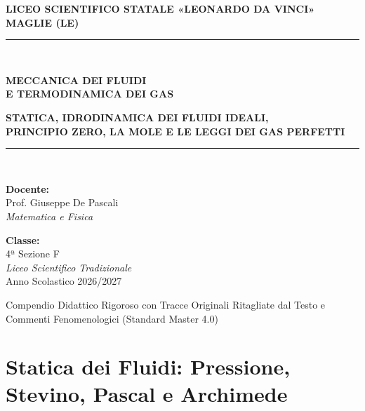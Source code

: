 \documentclass[11pt,a4paper,oneside]{report}
\begin{document}
\begin{titlepage}
\begin{center}
  \vspace*{1.0cm}
  {\Large\textbf{LICEO SCIENTIFICO STATALE «LEONARDO DA VINCI»}}\\[0.3cm]
  {\large\textbf{MAGLIE (LE)}}\\[1.8cm]
  \rule{\textwidth}{1.5pt}\\[0.7cm]
  {\fontsize{24}{34}\selectfont\bfseries\color{primaryBlue} MECCANICA DEI FLUIDI\\ E TERMODINAMICA DEI GAS\par}\vspace{0.7cm}
  {\fontsize{13}{20}\selectfont\bfseries\color{textDark} STATICA, IDRODINAMICA DEI FLUIDI IDEALI,\\ PRINCIPIO ZERO, LA MOLE E LE LEGGI DEI GAS PERFETTI\par}\vspace{0.7cm}
  \rule{\textwidth}{1.5pt}\\[2.0cm]
  
  \begin{minipage}{0.48\textwidth}
    \textbf{Docente:}\\
    Prof. Giuseppe De Pascali\\
    \textit{Matematica e Fisica}
  \end{minipage}
  \hfill
  \begin{minipage}{0.48\textwidth}
    \raggedleft
    \textbf{Classe:}\\
    4ª Sezione F\\
    \textit{Liceo Scientifico Tradizionale}\\
    Anno Scolastico 2026/2027
  \end{minipage}

  \vfill
  {\small Compendio Didattico Rigoroso con Tracce Originali Ritagliate dal Testo e Commenti Fenomenologici (Standard Master 4.0)}
\end{center}
\end{titlepage}

\tableofcontents
\newpage


\chapter{Statica dei Fluidi: Pressione, Stevino, Pascal e Archimede}
\end{document}
